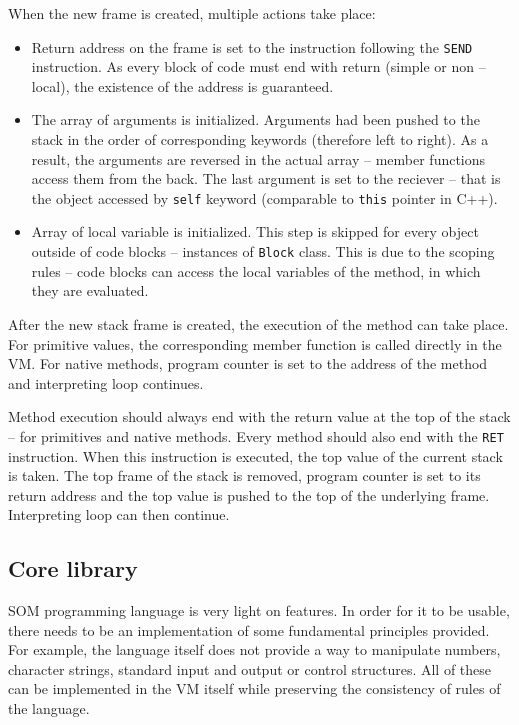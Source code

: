 \documentclass[thesis=M,english]{FITthesis}[2019/12/23]
\begin{document}
When the new frame is created, multiple actions take place:
\begin{itemize}
	\item Return address on the frame is set to the instruction following the \texttt{SEND} instruction. As every block of code must end
		with return (simple or non -- local), the existence of the address is guaranteed.
	\item The array of arguments is initialized. Arguments had been pushed to the stack in the order of corresponding keywords (therefore
		left to right). As a result, the arguments are reversed in the actual array -- member functions access them from the back. The
		last argument is set to the reciever -- that is the object accessed by \texttt{self} keyword (comparable to \texttt{this} pointer in
		C++).
	\item Array of local variable is initialized. This step is skipped for every object outside of code blocks -- instances of \texttt{Block}
		class. This is due to the scoping rules -- code blocks can access the local variables of the method, in which they are evaluated.
\end{itemize}

After the new stack frame is created, the execution of the method can take place. For primitive values, the corresponding member function
is called directly in the VM. For native methods, program counter is set to the address of the method and interpreting loop continues.

Method execution should always end with the return value at the top of the stack -- for primitives and native methods. Every method
should also end with the \texttt{RET} instruction. When this instruction is executed, the top value of the current stack is taken.
The top frame of the stack is removed, program counter is set to its return address and the top value is pushed to the top of the
underlying frame. Interpreting loop can then continue.

\subsection{Core library}
SOM programming language is very light on features. In order for it to be usable, there needs to be an implementation of some fundamental principles provided.
For example, the language itself does not provide a way to manipulate numbers, character strings, standard input and output or control structures. All of these
can be implemented in the VM itself while preserving the consistency of rules of the language.
\end{document}
